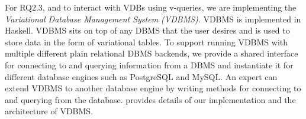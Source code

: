 For RQ2.3, and to interact with VDBs using v-queries, we are implementing
the
\emph{Variational Database Management System (VDBMS)}.
VDBMS is implemented in Haskell. VDBMS sits on 
top of any DBMS that the user desires and is used to store  data 
in the form of variational tables.
To support running VDBMS with multiple different plain relational DBMS backends,
we provide
a shared interface
for connecting to and querying information from a DBMS and
instantiate it for different database engines such as PostgreSQL and
MySQL. 
An expert can extend VDBMS to another database engine by
writing methods for connecting to and querying from the database.
 provides details of our implementation and the architecture of 
VDBMS.






